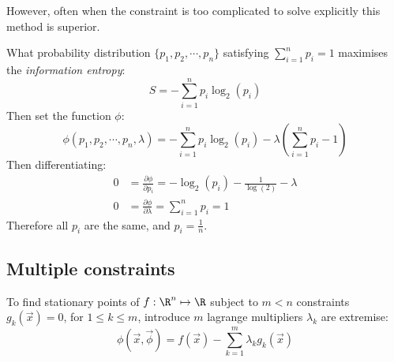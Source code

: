 \documentclass[../Main.tex]{subfiles}
\begin{document}
However, often when the constraint is too complicated to solve explicitly this method is superior.
\begin{example}
    What probability distribution $\{p_1, p_2, \cdots, p_n\}$ satisfying $\sum_{i = 1}^n p_i = 1$ maximises the \textit{information entropy}:
    \begin{equation*}
        S = -\sum_{i = 1}^n p_i \log_2(p_i)
    \end{equation*}
    Then set the function $\phi$:
    \begin{equation*}
        \phi(p_1, p_2, \cdots, p_n, \lambda) = -\sum_{i = 1}^n p_i \log_2(p_i) - \lambda\left(\sum_{i = 1}^n p_i - 1\right)
    \end{equation*}
    Then differentiating:
    \begin{align*}
        0 &= \frac{\partial \phi}{\partial p_i} = -\log_2(p_i) - \frac{1}{\log(2)} - \lambda \\
        0 &= \frac{\partial \phi}{\partial \lambda} = \sum_{i = 1}^n p_i = 1 
    \end{align*}
    Therefore all $p_i$ are the same, and $p_i = \frac{1}{n}$.
\end{example}
\subsection{Multiple constraints}
To find stationary points of $f : \R^n \mapsto \R$ subject to $m < n$ constraints $g_k(\vec{x}) = 0$, for $1 \leq k \leq m$, introduce $m$ lagrange multipliers $\lambda_k$ are extremise:
\begin{equation*}
    \phi(\vec{x}, \vec{\phi}) = f(\vec{x}) - \sum_{k = 1}^m \lambda_k g_k(\vec{x})
\end{equation*}
\end{document}
